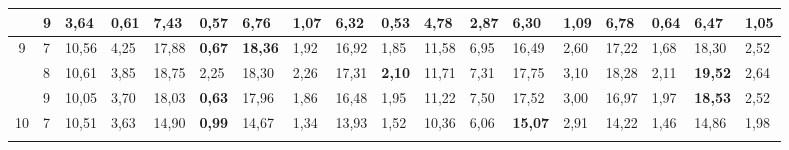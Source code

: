 \documentclass[conference]{IEEEtran}
\begin{document}
\begin{table}[]
\begin{tabular}{|cl|ll|ll|ll|ll|ll|ll|ll|ll|}
		\multicolumn{1}{|c|}{}                    & 9          & \multicolumn{1}{l|}{3,64}          & 0,61          & \multicolumn{1}{l|}{\textbf{7,43}}  & 0,57          & \multicolumn{1}{l|}{6,76}           & 1,07          & \multicolumn{1}{l|}{6,32}          & \textbf{0,53} & \multicolumn{1}{l|}{4,78}                 & 2,87 & \multicolumn{1}{l|}{6,30}           & 1,09 & \multicolumn{1}{l|}{6,78}           & 0,64          & \multicolumn{1}{l|}{6,47}           & 1,05 \\ \hline
		\multicolumn{1}{|c|}{\multirow{3}{*}{9}}  & 7          & \multicolumn{1}{l|}{10,56}         & 4,25          & \multicolumn{1}{l|}{17,88}          & \textbf{0,67} & \multicolumn{1}{l|}{\textbf{18,36}} & 1,92          & \multicolumn{1}{l|}{16,92}         & 1,85          & \multicolumn{1}{l|}{11,58}                & 6,95 & \multicolumn{1}{l|}{16,49}          & 2,60 & \multicolumn{1}{l|}{17,22}          & 1,68          & \multicolumn{1}{l|}{18,30}          & 2,52 \\ \cline{2-18} 
		\multicolumn{1}{|c|}{}                    & 8          & \multicolumn{1}{l|}{10,61}         & 3,85          & \multicolumn{1}{l|}{18,75}          & 2,25          & \multicolumn{1}{l|}{18,30}          & 2,26          & \multicolumn{1}{l|}{17,31}         & \textbf{2,10} & \multicolumn{1}{l|}{11,71}                & 7,31 & \multicolumn{1}{l|}{17,75}          & 3,10 & \multicolumn{1}{l|}{18,28}          & 2,11          & \multicolumn{1}{l|}{\textbf{19,52}} & 2,64 \\ \cline{2-18} 
		\multicolumn{1}{|c|}{}                    & 9          & \multicolumn{1}{l|}{10,05}         & 3,70          & \multicolumn{1}{l|}{18,03}          & \textbf{0,63} & \multicolumn{1}{l|}{17,96}          & 1,86          & \multicolumn{1}{l|}{16,48}         & 1,95          & \multicolumn{1}{l|}{11,22}                & 7,50 & \multicolumn{1}{l|}{17,52}          & 3,00 & \multicolumn{1}{l|}{16,97}          & 1,97          & \multicolumn{1}{l|}{\textbf{18,53}} & 2,52 \\ \hline
		\multicolumn{1}{|c|}{\multirow{3}{*}{10}} & 7          & \multicolumn{1}{l|}{10,51}         & 3,63          & \multicolumn{1}{l|}{14,90}          & \textbf{0,99} & \multicolumn{1}{l|}{14,67}          & 1,34          & \multicolumn{1}{l|}{13,93}         & 1,52          & \multicolumn{1}{l|}{10,36}                & 6,06 & \multicolumn{1}{l|}{\textbf{15,07}} & 2,91 & \multicolumn{1}{l|}{14,22}          & 1,46          & \multicolumn{1}{l|}{14,86}          & 1,98 \\ \cline{2-18} 

\end{tabular}
\end{table}
\end{document}

